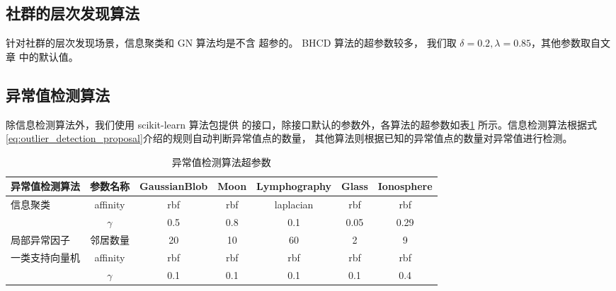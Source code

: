 \subsection{社群的层次发现算法}
针对社群的层次发现场景，信息聚类和 GN 算法均是不含
超参的。
BHCD 算法的超参数较多，
我们取 $\delta=0.2, \lambda=0.85$，其他参数取自文章\citet{RN23}
中的默认值。
\subsection{异常值检测算法}
除信息检测算法外，我们使用 scikit-learn 算法包提供
的接口，除接口默认的参数外，各算法的超参数如表\ref{tab:outlier_detection_alg_hyperparameter}
所示。信息检测算法根据式\ref{eq:outlier_detection_proposal}介绍的规则自动判断异常值点的数量，
其他算法则根据已知的异常值点的数量对异常值进行检测。

\begin{table}[!ht]
  \begin{adjustbox}{width=\columnwidth,center}
  \begin{tabular}{|l|c|c|c|c|c|c|}
  \hline
   异常值检测算法  &   参数名称 &
   GaussianBlob &  Moon &  Lymphography &   Glass &   Ionosphere \\
  \hline
   \multirow{2}{*}{信息聚类}  & affinity
   & rbf & rbf & laplacian
   & rbf & rbf \\
   \cline{2-7}
   & $\gamma$ & 0.5 & 0.8 & 0.1 & 0.05 & 0.29 \\
   \hline
   局部异常因子  &  
   邻居数量 & 20 &  10
   &  60
   & 2 &   9 \\
   \hline
   \multirow{2}{*}{一类支持向量机}  & 
   affinity & rbf &  rbf
   & rbf
   & rbf & rbf \\
   \cline{2-7}
   & $\gamma$ & 0.1 & 0.1 & 0.1 & 0.1 & 0.4\\
  \hline
  \end{tabular}
\end{adjustbox}
\caption{异常值检测算法超参数}\label{tab:outlier_detection_alg_hyperparameter}
\end{table}


